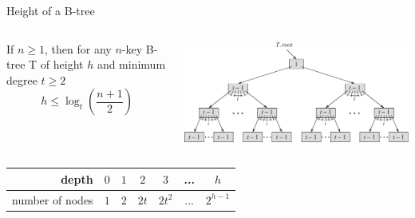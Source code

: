 \documentclass[11pt,t]{beamer}
\begin{document}
	\begin{frame}{Height of a B-tree}
		\begin{columns}[c]
			\begin{column}{.5\textwidth}
				\onslide<+->\begin{theorem}
					If \(n \geq 1\), then for any \(n\)-key B-tree T of height \(h\) and minimum degree \(t\geq 2\) \[h \leq \log_t\left(\frac{n+1}{2}\right)\]
				\end{theorem}
			\end{column}
			\begin{column}{.5\textwidth}
				\onslide<+->\includegraphics[width=\columnwidth]{images/height}
			\end{column}
		\end{columns}
		\centering
		\vspace{0.5cm}
		\renewcommand*{\arraystretch}{1.4}
		\onslide<+->\begin{tabular}{r | *{6}{|c}}
			depth & \(0\) & \(1\) & \(2\) & \(3\) & ... & \(h\)\\ \hline
			number of nodes & \(1\) & \(2\) & \(2t\) & \(2t^2\) & ... & \(2^{h-1}\)
		\end{tabular}
	\end{frame}
\end{document}
